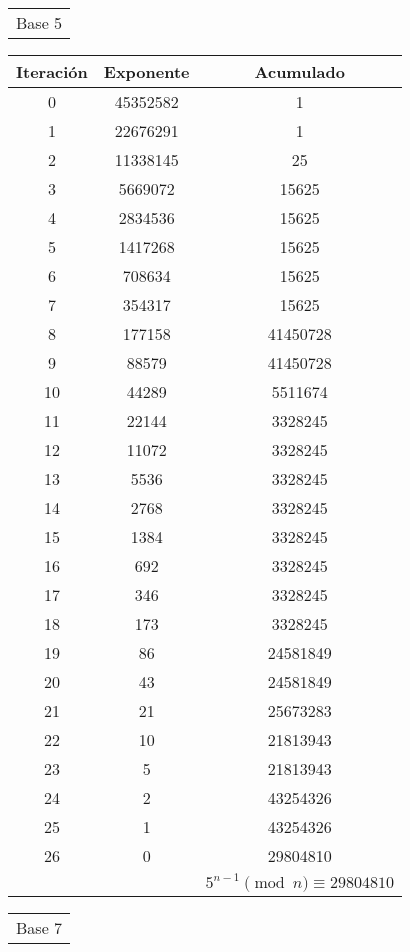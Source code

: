 \documentclass[fleqn]{article}
\begin{document}
\begin{center}
        \newpage
        \begin{tabular}{c}
            Base 5 \\
        \end{tabular}
        \begin{tabular}{c | c | c}
            Iteración & Exponente & Acumulado \\ \hline
            0 & 45352582 & 1 \\
            1 & 22676291 & 1 \\
            2 & 11338145 & 25 \\
            3 & 5669072 & 15625 \\
            4 & 2834536 & 15625 \\
            5 & 1417268 & 15625 \\
            6 & 708634 & 15625 \\
            7 & 354317 & 15625 \\
            8 & 177158 & 41450728 \\
            9 & 88579 & 41450728 \\
            10 & 44289 & 5511674 \\
            11 & 22144 & 3328245 \\
            12 & 11072 & 3328245 \\
            13 & 5536 & 3328245 \\
            14 & 2768 & 3328245 \\
            15 & 1384 & 3328245 \\
            16 & 692 & 3328245 \\
            17 & 346 & 3328245 \\
            18 & 173 & 3328245 \\
            19 & 86 & 24581849 \\
            20 & 43 & 24581849 \\
            21 & 21 & 25673283 \\
            22 & 10 & 21813943 \\
            23 & 5 & 21813943 \\
            24 & 2 & 43254326 \\
            25 & 1 & 43254326 \\
            26 & 0 & 29804810 \\ \hline
            && $ 5^{n-1} \pmod{n} \equiv 29804810 $
        \end{tabular}
        \newpage
        \begin{tabular}{c}
            Base 7 \\

\end{tabular}
\end{center}
\end{document}
